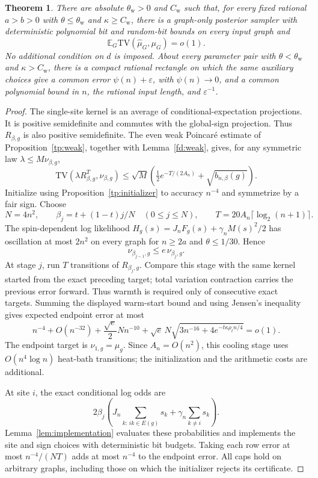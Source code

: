 \documentclass[11pt]{article}
\newcommand{\TV}{\mathrm{TV}}
\def\E{\mathbb{E}}
\newtheorem{thm}{Theorem}[section]
\numberwithin{equation}{section}
\begin{document}
\begin{thm}\label{tp:main}
There are absolute $\theta_{\mathrm w}>0$ and $C_{\mathrm w}$ such that, for every fixed rational $a>b>0$ with $\theta\le\theta_{\mathrm w}$ and $\kappa\ge C_{\mathrm w}$, there is a graph-only posterior sampler with deterministic polynomial bit and random-bit bounds on every input graph and
\[
 \E_G\TV(\widehat\mu_G,\mu_G)=o(1).
\]
No additional condition on $d$ is imposed. About every parameter pair with $\theta<\theta_{\mathrm w}$ and $\kappa>C_{\mathrm w}$, there is a compact rational rectangle on which the same auxiliary choices give a common error $\psi(n)+\varepsilon$, with $\psi(n)\to0$, and a common polynomial bound in $n$, the rational input length, and $\varepsilon^{-1}$.
\end{thm}
\begin{proof}
The single-site kernel is an average of conditional-expectation projections. It is positive semidefinite and commutes with the global-sign projection. Thus $R_{\beta,g}$ is also positive semidefinite. The even weak Poincar\'e estimate of Proposition~\ref{tp:weak}, together with Lemma~\ref{fd:weak}, gives, for any symmetric law $\lambda\le M\nu_{\beta,g}$,
\[
 \TV(\lambda R_{\beta,g}^T,\nu_{\beta,g})
 \le\sqrt M\left(\tfrac12 e^{-T/(2A_n)}+\sqrt{b_{n,\beta}(g)}\right).
\]
Initialize using Proposition~\ref{tp:initializer} to accuracy $n^{-4}$ and symmetrize by a fair sign. Choose
\[
 N=4n^2,\qquad\beta_j=t+(1-t)j/N\quad(0\le j\le N),
 \qquad T=20A_n\lceil\log_2(n+1)\rceil.
\]
The spin-dependent log likelihood $H_g(s)=J_nF_g(s)+\gamma_nM(s)^2/2$ has oscillation at most $2n^2$ on every graph for $n\ge2a$ and $\theta\le1/30$. Hence
\[
 \nu_{\beta_{j-1},g}\le e\,\nu_{\beta_j,g}.
\]
At stage $j$, run $T$ transitions of $R_{\beta_j,g}$. Compare this stage with the same kernel started from the exact preceding target; total variation contraction carries the previous error forward. Thus warmth is required only of consecutive exact targets. Summing the displayed warm-start bound and using Jensen's inequality gives expected endpoint error at most
\[
 n^{-4}+O(n^{-32})+\frac{\sqrt e}{2}Nn^{-10}
 +\sqrt e\,N\sqrt{3n^{-16}+4e^{-t\kappa\rho_t n/4}}=o(1).
\]
The endpoint target is $\nu_{1,g}=\mu_g$. Since $A_n=O(n^2)$, this cooling stage uses $O(n^4\log n)$ heat-bath transitions; the initialization and the arithmetic costs are additional.

At site $i$, the exact conditional log odds are
\[
 2\beta_j\left(J_n\sum_{k:\,ik\in E(g)}s_k
                  +\gamma_n\sum_{k\ne i}s_k\right).
\]
Lemma~\ref{lem:implementation} evaluates these probabilities and implements the site and sign choices with deterministic bit budgets. Taking each row error at most $n^{-4}/(NT)$ adds at most $n^{-4}$ to the endpoint error. All caps hold on arbitrary graphs, including those on which the initializer rejects its certificate.


\end{proof}
\end{document}
